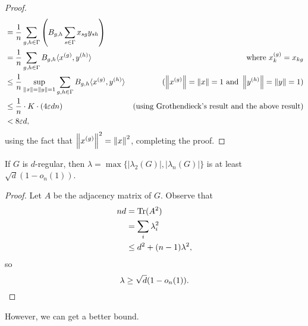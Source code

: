 \begin{proof}
\begin{align*}
						&= \frac{1}{n} \sum_{g,h\in\Gamma} \left(B_{g,h} \sum_{s\in\Gamma} x_{sg} y_{sh}\right) \\
						&= \frac{1}{n} \sum_{g,h\in\Gamma} B_{g,h} \langle x^{(g)} , y^{(h)} \rangle & \text{where $x^{(g)}_{k} = x_{kg}$} \\
						&\le \frac{1}{n} \sup_{\left\lVert x\right\rVert = \left\lVert y\right\rVert = 1} \sum_{g,h\in\Gamma} B_{g,h} \langle x^{(g)} , y^{(h)} \rangle & (\left\lVert x^{(g)}\right\rVert = \left\lVert x\right\rVert = 1 \text{ and } \left\lVert y^{(h)}\right\rVert = \left\lVert y\right\rVert = 1) \\
						&\le \frac{1}{n} \cdot K \cdot (4\varepsilon dn) & \text{(using Grothendieck's result and the above result)} \\
						&< 8\varepsilon d,
				\end{align*}
				using the fact that $\left\lVert x^{(g)}\right\rVert^2 = \left\lVert x\right\rVert^2$, completing the proof.
			\end{proof}

			\begin{ftheo}
				If $G$ is $d$-regular, then $\lambda = \max\{|\lambda_2(G)|,|\lambda_n(G)|\}$ is at least $\sqrt{d} (1 - o_n(1))$.
			\end{ftheo}
			\begin{proof}
				Let $A$ be the adjacency matrix of $G$. Observe that
				\begin{align*}
					nd &= \operatorname{Tr}(A^2) \\
						&= \sum_i \lambda_i^2 \\
						&\le d^2 + (n-1)\lambda^2,
				\end{align*}
				so
				\[ \lambda \ge \sqrt{d} (1-o_n(1)). \qedhere \]
			\end{proof}

			However, we can get a better bound.

